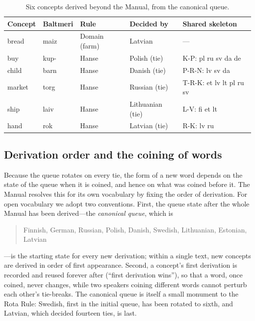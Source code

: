 \begin{table}[t]
\centering\small
\caption{Six concepts derived beyond the Manual, from the canonical queue.}
\label{tab:newwords}
\setlength{\tabcolsep}{3pt}\scriptsize
\begin{tabular}{@{}llp{1.5cm}p{1.4cm}p{2.7cm}@{}}
\toprule
Concept & Baltmeri & Rule & Decided by & Shared skeleton \\
\midrule
bread & maiz & Domain (farm) & Latvian & --- \\
buy & kup- & Hanse & Polish (tie) & K-P: pl ru sv da de \\
child & barn & Hanse & Danish (tie) & P-R-N: lv sv da \\
market & torg & Hanse & Russian (tie) & T-R-K: et lv lt pl ru sv \\
ship & laiv & Hanse & Lithuanian (tie) & L-V: fi et lt \\
hand & rok & Hanse & Latvian (tie) & R-K: lv ru \\
\bottomrule
\end{tabular}
\end{table}

\subsection{Derivation order and the coining of words}\label{sec:eval-queue}
Because the queue rotates on every tie, the form of a new word depends on the state of the queue when it is coined, and hence on what was coined before it. The Manual resolves this for its own vocabulary by fixing the order of derivation. For open vocabulary we adopt two conventions. First, the queue state after the whole Manual has been derived---the \emph{canonical queue}, which is
\begin{quote}
Finnish, German, Russian, Polish, Danish, Swedish, Lithuanian, Estonian, Latvian
\end{quote}
---is the starting state for every new derivation; within a single text, new concepts are derived in order of first appearance. Second, a concept's first derivation is recorded and reused forever after (``first derivation wins''), so that a word, once coined, never changes, while two speakers coining different words cannot perturb each other's tie-breaks. The canonical queue is itself a small monument to the Rota Rule: Swedish, first in the initial queue, has been rotated to sixth, and Latvian, which decided fourteen ties, is last.
